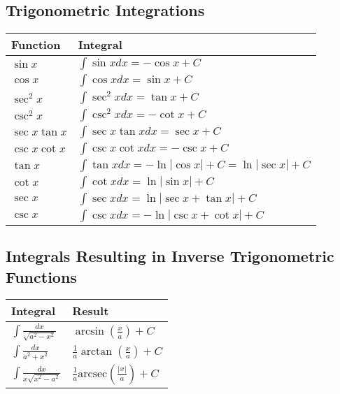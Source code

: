 \documentclass{article}
\begin{document}
\vspace{2em}

\subsection*{\large Trigonometric Integrations}

\begin{center}
\begin{tabular}{|l|l|}
    \hline
    \textbf{Function} & \textbf{Integral} \\
    \hline
    $\sin x$ & $\int \sin x dx = -\cos x + C$ \\
    $\cos x$ & $\int \cos x dx = \sin x + C$ \\
    $\sec^2 x$ & $\int \sec^2 x dx = \tan x + C$ \\
    $\csc^2 x$ & $\int \csc^2 x dx = -\cot x + C$ \\
    $\sec x \tan x$ & $\int \sec x \tan x dx = \sec x + C$ \\
    $\csc x \cot x$ & $\int \csc x \cot x dx = -\csc x + C$ \\
    $\tan x$ & $\int \tan x dx = -\ln|\cos x| + C = \ln|\sec x| + C$ \\
    $\cot x$ & $\int \cot x dx = \ln|\sin x| + C$ \\
    $\sec x$ & $\int \sec x dx = \ln|\sec x + \tan x| + C$ \\
    $\csc x$ & $\int \csc x dx = -\ln|\csc x + \cot x| + C$ \\
    \hline
\end{tabular}
\end{center}

\vspace{2em}

\subsection*{\large Integrals Resulting in Inverse Trigonometric Functions}

\begin{center}
\begin{tabular}{|l|l|}
    \textbf{Integral} & \textbf{Result} \\
    \hline
    $\int \frac{dx}{\sqrt{a^2-x^2}}$ & $\arcsin\left(\frac{x}{a}\right) + C$ \\
    $\int \frac{dx}{a^2+x^2}$ & $\frac{1}{a}\arctan\left(\frac{x}{a}\right) + C$ \\
    $\int \frac{dx}{x\sqrt{x^2-a^2}}$ & $\frac{1}{a}\text{arcsec}\left(\frac{|x|}{a}\right) + C$ \\
    \hline
\end{tabular}
\end{center}
\end{document}

